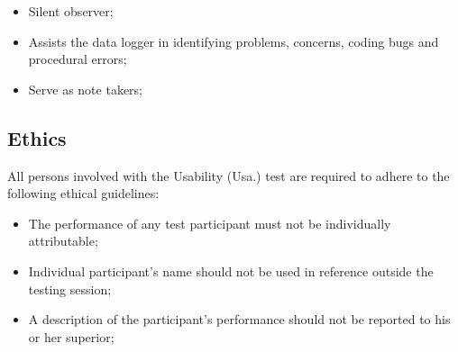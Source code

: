 \begin{itemize}
\item Silent observer;
\item Assists the data logger in identifying problems, concerns, coding bugs and procedural errors;
\item Serve as note takers;
\end{itemize}

\subsection{Ethics}

All persons involved with the Usability (Usa.) test are required to adhere to the following ethical guidelines:

\begin{itemize}
\item The performance of any test participant must not be individually attributable;
\item Individual participant's name should not be used in reference outside the testing session;
\item A description of the participant's performance should not be reported to his or her superior;
\end{itemize}

